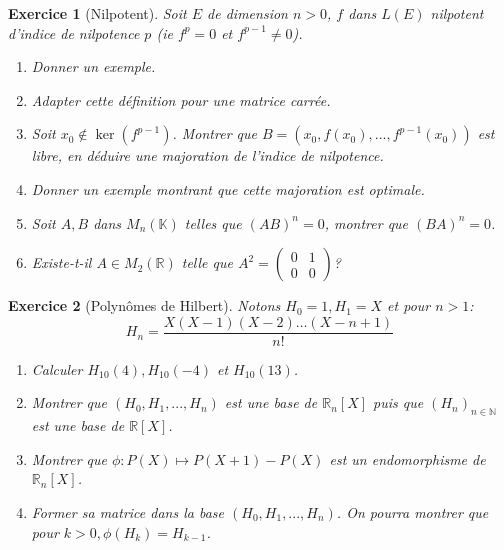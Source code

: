 \documentclass[12pt,a4paper]{article}
\newcommand{\R}{\mathbb{R}}
\newcommand{\N}{\mathbb{N}}
\newcommand{\K}{\mathbb{K} }
\theoremstyle{break}
\theoremstyle{break}
\newtheorem{Exo}{Exercice}
\begin{document}
%

\begin{Exo}[Nilpotent]
Soit $E$ de dimension $n>0$, $f$ dans $L(E)$ nilpotent d'indice de nilpotence $p$ (ie $f^p=0$ et $f^{p-1}\neq 0$).

\begin{enumerate}
	\item Donner un exemple.
	\item Adapter cette définition pour une matrice carrée.
	\item
	Soit $x_0\notin\ker(f^{p-1})$. Montrer que $B=\left(x_0,f(x_0),...,f^{p-1}(x_0)\right)$ est libre, en déduire une majoration de l'indice de nilpotence.
	\item
	Donner un exemple montrant que cette majoration est optimale.
	\item Soit $A,B$ dans $M_n(\K)$ telles que $(AB)^n=0$, montrer que $(BA)^n=0$.
	\item Existe-t-il $A\in M_2(\R)$ telle que $A^2=\begin{pmatrix}
	0 & 1 \\
	0 & 0
	\end{pmatrix}$?
	 
\end{enumerate}

\end{Exo}

\begin{Exo}[Polynômes de Hilbert]
	Notons $H_0=1,H_1=X$ et pour $n>1$:$$H_{n}=\frac {X \left( X-1\right) \left( X-2\right) \ldots \left( X-n+1\right) } {n!}$$
	\begin{enumerate}
		\item
		Calculer $H_{10}(4),H_{10}(-4)$ et $H_{10}(13)$.
		\item
		Montrer que $(H_0,H_1,...,H_n)$ est une base de $\R_n[X]$ puis que $(H_n)_{n\in\N}$ est une base de $\R[X]$.
		\item
		Montrer que $\phi:P(X)\mapsto P(X+1)-P(X)$ est un endomorphisme de $\R_n[X]$.
		\item
		Former sa matrice  dans la base $(H_0,H_1,...,H_n)$. On pourra montrer que pour $k>0,\phi(H_k)=H_{k-1}$.
	\end{enumerate}
\end{Exo}
\end{document}
